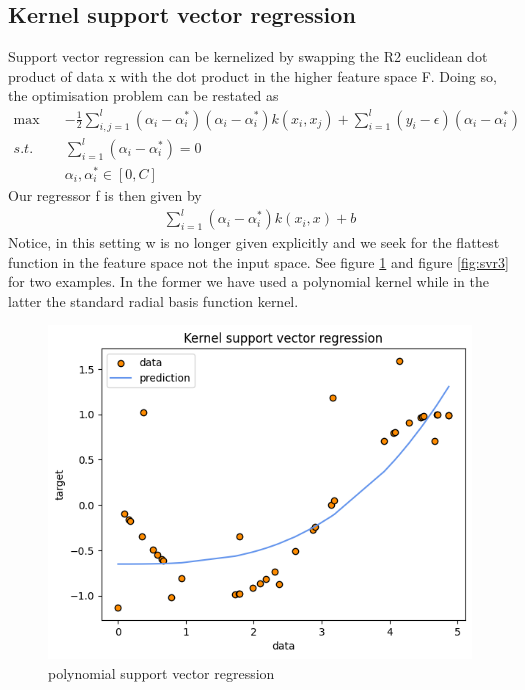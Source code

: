 \subsection{Kernel support vector regression}
Support vector regression can be kernelized by swapping the R2 euclidean dot product of data x with the dot product in the higher feature space F. Doing so, the optimisation problem can be restated as
\begin{equation}
    \begin{aligned}
        \max \quad& -\frac{1}{2}\sum\limits_{i,j=1}^l(\alpha_i-\alpha_i^*)(\alpha_i-\alpha_i^*)k(x_i, x_j)+\sum\limits_{i=1}^l(y_i-\epsilon)(\alpha_i-\alpha_i^*)
        \\
        s.t. \quad& \sum\limits_{i=1}^l(\alpha_i-\alpha_i^*)=0
        \\
        \quad& \alpha_i, \alpha_i^* \in [0,C]
    \end{aligned}
\end{equation}
Our regressor f is then given by
\begin{equation}
    \begin{aligned}
        \sum\limits_{i=1}^l(\alpha_i-\alpha_i^*)k(x_i, x)+b
    \end{aligned}
\end{equation}
Notice, in this setting w is no longer given explicitly and we seek for the flattest function in the feature space not the input space.
See figure \ref{fig:svr2} and figure \ref{fig:svr3} for two examples. In the former we have used a polynomial kernel while in the latter the standard radial basis function kernel.
\begin{figure}
    \includegraphics[width=\textwidth]{images/svr2.png}
    \caption{polynomial support vector regression}
    \label{fig:svr2}
\end{figure}

